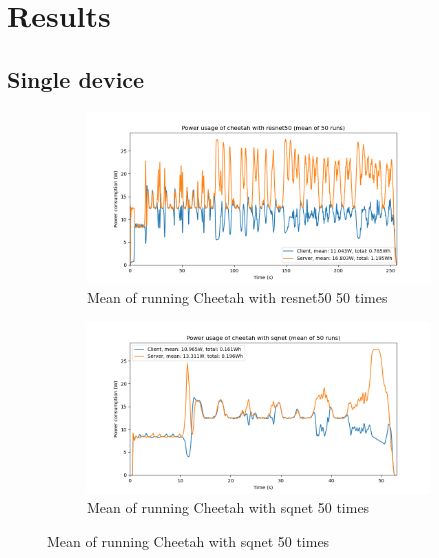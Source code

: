 \documentclass[../thesis.tex]{subfiles}
\begin{document}
\section{Results}
\subsection{Single device}
\label{ssec:singledevice}
\begin{figure}[htb]
    \begin{subfigure}{.475\linewidth}
            \includegraphics[width=\textwidth]{Thesis/Images/Means/mean_cheetah-resnet50.png}
            \caption{Mean of running Cheetah with resnet50 50 times}
            \label{fig:mean_cheetah_resnet50}
    \end{subfigure}\hfill %
    \begin{subfigure}{.475\linewidth}
            \includegraphics[width=\textwidth]{Thesis/Images/Means/mean_cheetah-sqnet.png}
            \caption{Mean of running Cheetah with sqnet 50 times}
            \label{fig:mean_cheetah_sqnet}
    \end{subfigure}

    \medskip %
    

\end{figure}
\end{document}
